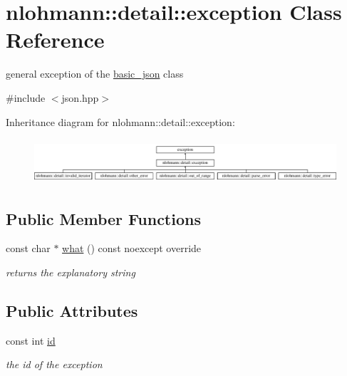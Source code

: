 \hypertarget{classnlohmann_1_1detail_1_1exception}{}\section{nlohmann\+:\+:detail\+:\+:exception Class Reference}
\label{classnlohmann_1_1detail_1_1exception}


general exception of the \mbox{\hyperlink{classnlohmann_1_1basic__json}{basic\+\_\+json}} class  




{\ttfamily \#include $<$json.\+hpp$>$}

Inheritance diagram for nlohmann\+:\+:detail\+:\+:exception\+:\begin{figure}[H]
\begin{center}
\leavevmode
\includegraphics[height=1.680000cm]{classnlohmann_1_1detail_1_1exception}
\end{center}
\end{figure}
\subsection*{Public Member Functions}
\begin{DoxyCompactItemize}
\item 
\mbox{\label{classnlohmann_1_1detail_1_1exception_a0672c25ecdf14d1a071d4d6478a65af0}} 
const char $\ast$ \mbox{\hyperlink{classnlohmann_1_1detail_1_1exception_a0672c25ecdf14d1a071d4d6478a65af0}{what}} () const noexcept override
\begin{DoxyCompactList}\small\item\em returns the explanatory string \end{DoxyCompactList}\end{DoxyCompactItemize}
\subsection*{Public Attributes}
\begin{DoxyCompactItemize}
\item 
\mbox{\label{classnlohmann_1_1detail_1_1exception_a0d4589a3fb54e81646d986c05efa3b9a}} 
const int \mbox{\hyperlink{classnlohmann_1_1detail_1_1exception_a0d4589a3fb54e81646d986c05efa3b9a}{id}}
\begin{DoxyCompactList}\small\item\em the id of the exception \end{DoxyCompactList}\end{DoxyCompactItemize}
